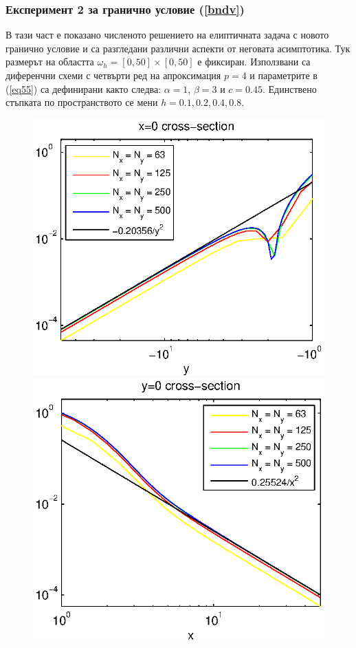 \documentclass[a4paper]{article}
\newcommand{\rf}[1]{(\ref{#1})}
\theoremstyle{remark}
\begin{document}
\subsubsection{Експеримент 2 за гранично условие \rf{bndv}}
В тази част е показано численото решението на елиптичната задача с новото гранично условие и са разгледани различни аспекти от неговата асимптотика. Тук размерът на областта $\omega_h = [0, 50] \times [0, 50]$ е фиксиран. Използвани са диференчни схеми с четвърти ред на апроксимация $p=4$ и параметрите в \rf{eq55} са дефинирани както следва: $\alpha = 1$, $\beta = 3$ и $c=0.45$. Единствено стъпката по пространството се мени $h=0.1, 0.2, 0.4, 0.8$.
\begin{figure}[ht]
	\begin{minipage}[b]{0.5\linewidth}
		\raggedleft
		\includegraphics[width=\linewidth]{NewBoundaryCondition/crossSectionLogX=0.eps}
	\end{minipage}	
	\begin{minipage}[b]{0.5\linewidth}
		\raggedright
		 \includegraphics[width=\linewidth]{NewBoundaryCondition/crossSectionLogY=0.eps}

\end{minipage}
\end{figure}
\end{document}

